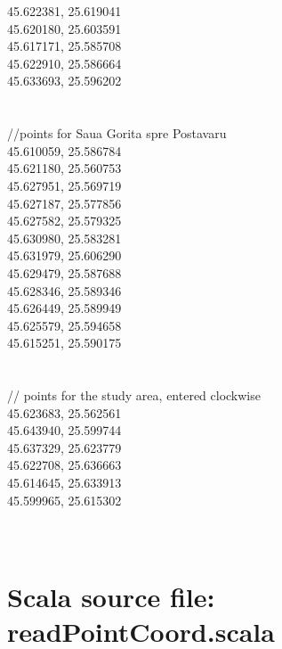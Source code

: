 \documentclass {article}
\begin{document}
\begin{appendices}
45.622381, 25.619041\\
45.620180, 25.603591\\
45.617171, 25.585708\\
45.622910, 25.586664\\
45.633693, 25.596202\\
\\
\\
//points for Saua Gorita spre Postavaru\\
45.610059, 25.586784\\
45.621180, 25.560753\\
45.627951, 25.569719\\
45.627187, 25.577856\\
45.627582, 25.579325\\
45.630980, 25.583281\\
45.631979, 25.606290\\
45.629479, 25.587688\\
45.628346, 25.589346\\
45.626449, 25.589949\\
45.625579, 25.594658\\
45.615251, 25.590175\\
\\
\\
// points for the study area, entered clockwise\\
45.623683, 25.562561\\
45.643940, 25.599744\\
45.637329, 25.623779\\
45.622708, 25.636663\\
45.614645, 25.633913\\
45.599965, 25.615302\\
\\
\\

\section {Scala source file: readPointCoord.scala}


\end{appendices}
\end{document}
